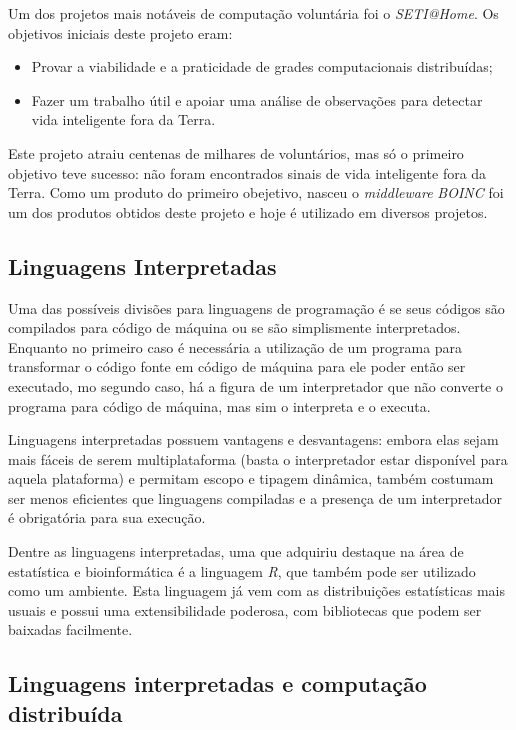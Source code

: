 Um dos projetos mais notáveis de computação voluntária foi o \textit{SETI@Home}. Os objetivos iniciais deste projeto eram: 

\begin{itemize}
  \item Provar a viabilidade e a praticidade de grades computacionais distribuídas;
  \item Fazer um trabalho útil e apoiar uma análise de observações para detectar vida inteligente fora da Terra.
\end{itemize}

Este projeto atraiu centenas de milhares de voluntários, mas só o primeiro objetivo teve sucesso: não foram encontrados sinais 
de vida inteligente fora da Terra. Como um produto do primeiro obejetivo, nasceu o \emph{middleware} 
\emph{BOINC} foi um dos produtos obtidos deste projeto e hoje é utilizado em diversos projetos. 

\subsection{Linguagens Interpretadas}


Uma das possíveis divisões para linguagens de programação é se seus códigos são compilados para código de máquina ou se são simplismente 
interpretados. Enquanto no primeiro caso é necessária a utilização de um programa para transformar o código fonte em código de máquina 
para ele poder então ser executado, mo segundo caso,
há a figura de um interpretador que não converte o programa para 
código de máquina, mas sim o interpreta e o executa. 

Linguagens interpretadas possuem vantagens e desvantagens: embora elas sejam mais fáceis de serem multiplataforma (basta o interpretador
estar disponível para aquela plataforma) e permitam escopo e tipagem dinâmica, também costumam ser menos eficientes que linguagens compiladas e 
a presença de um interpretador é obrigatória para sua execução. 

Dentre as linguagens interpretadas, uma que adquiriu destaque na área de estatística e bioinformática é a linguagem \emph{R}, que também 
pode ser utilizado como um ambiente. Esta linguagem já vem com as distribuições estatísticas mais usuais e possui uma extensibilidade 
poderosa, com bibliotecas que podem ser baixadas facilmente.


\subsection{Linguagens interpretadas e computação distribuída}

